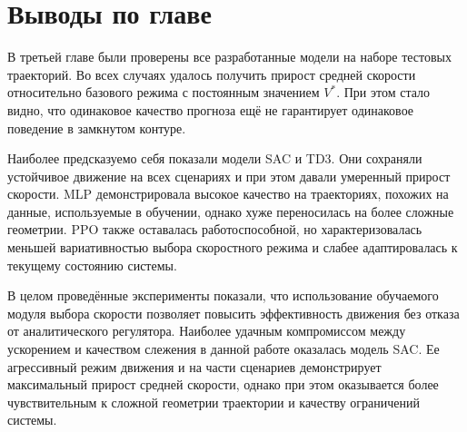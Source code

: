 \section{Выводы по главе}

В третьей главе были проверены все разработанные модели на наборе тестовых траекторий.
Во всех случаях удалось получить прирост средней скорости относительно базового режима с постоянным значением $V^\ast$.
При этом стало видно, что одинаковое качество прогноза ещё не гарантирует одинаковое поведение в замкнутом контуре.

Наиболее предсказуемо себя показали модели SAC и TD3.
Они сохраняли устойчивое движение на всех сценариях и при этом давали умеренный прирост скорости.
MLP демонстрировала высокое качество на траекториях, похожих на данные, используемые в обучении, однако хуже переносилась на более сложные геометрии.
PPO также оставалась работоспособной, но характеризовалась меньшей вариативностью выбора скоростного режима и слабее адаптировалась к текущему состоянию системы.

В целом проведённые эксперименты показали, что использование обучаемого модуля выбора скорости позволяет повысить эффективность движения без отказа от аналитического регулятора.
Наиболее удачным компромиссом между ускорением и качеством слежения в данной работе оказалась модель SAC.
Ее агрессивный режим движения и на части сценариев демонстрирует максимальный прирост средней скорости, однако при этом оказывается более чувствительным к сложной геометрии траектории и качеству ограничений системы.